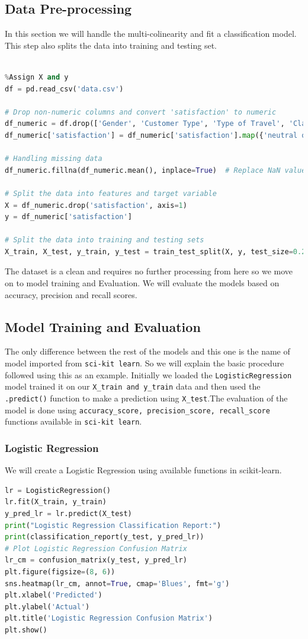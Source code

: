 \documentclass{article}
\begin{document}
\subsection{Data Pre-processing}
In this section we will handle the multi-colinearity and fit a classification model. This step also splits the data into training and testing set.
\begin{lstlisting}[language=Python]

%Assign X and y
df = pd.read_csv('data.csv')

# Drop non-numeric columns and convert 'satisfaction' to numeric
df_numeric = df.drop(['Gender', 'Customer Type', 'Type of Travel', 'Class'], axis=1)
df_numeric['satisfaction'] = df_numeric['satisfaction'].map({'neutral or dissatisfied': 0, 'satisfied': 1})

# Handling missing data
df_numeric.fillna(df_numeric.mean(), inplace=True)  # Replace NaN values with the mean of each column

# Split the data into features and target variable
X = df_numeric.drop('satisfaction', axis=1)
y = df_numeric['satisfaction']

# Split the data into training and testing sets
X_train, X_test, y_train, y_test = train_test_split(X, y, test_size=0.2, random_state=42)
\end{lstlisting}
The dataset is a clean and requires no further processing from here so we move on to model training and Evaluation.
We will evaluate the models based on accuracy, precision and recall scores.
\subsection{Model Training and Evaluation}
The only difference between the rest of the models and this one is the name of model imported from \verb|sci-kit learn|. So we will explain the basic procedure followed using this as an example. Initially we loaded the \verb|LogisticRegression| model trained it on our \verb|X_train and y_train| data and then used the \verb|.predict()| function to make a prediction using \verb|X_test|.The evaluation of the model is done using \verb|accuracy_score, precision_score, recall_score| functions available in \verb|sci-kit learn|.\\

\subsubsection{Logistic Regression }
We will create a Logistic Regression using available functions in scikit-learn. 
\begin{lstlisting}[language=Python]
lr = LogisticRegression()
lr.fit(X_train, y_train)
y_pred_lr = lr.predict(X_test)
print("Logistic Regression Classification Report:")
print(classification_report(y_test, y_pred_lr))
# Plot Logistic Regression Confusion Matrix
lr_cm = confusion_matrix(y_test, y_pred_lr)
plt.figure(figsize=(8, 6))
sns.heatmap(lr_cm, annot=True, cmap='Blues', fmt='g')
plt.xlabel('Predicted')
plt.ylabel('Actual')
plt.title('Logistic Regression Confusion Matrix')
plt.show()
\end{lstlisting}
\end{document}
